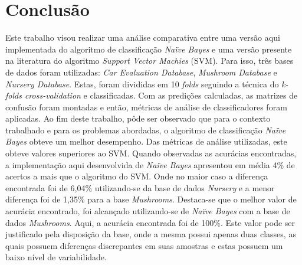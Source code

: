\documentclass[12pt]{article}
\begin{document}
\section{Conclusão} \label{conclu}
    Este trabalho visou realizar uma análise comparativa entre uma versão aqui implementada do algoritmo de classificação \textit{Naïve Bayes} e uma versão presente na literatura do algoritmo \textit{Support Vector Machies} (SVM). Para isso, três bases de dados foram utilizadas: \textit{Car Evaluation Database}, \textit{Mushroom Database} e \textit{Nursery Database}. Estas, foram divididas em 10 \textit{folds} seguindo a técnica do \textit{k-folds cross-validation} e classificadas. Com as predições calculadas, as matrizes de confusão foram montadas e então, métricas de análise de classificadores foram aplicadas. Ao fim deste trabalho, pôde ser observado que para o contexto trabalhado e para os problemas abordadas, o algoritmo de classificação \textit{Naïve Bayes} obteve um melhor desempenho. Das métricas de análise utilizadas, este obteve valores superiores ao SVM. Quando observadas as acurácias encontradas, a implementação aqui desenvolvida de \textit{Naïve Bayes} apresentou em média 4\% de acertos a mais que o algoritmo do SVM. Onde no maior caso a diferença encontrada foi de 6,04\% utilizando-se da base de dados \textit{Nursery} e a menor diferença foi de 1,35\% para a base \textit{Mushrooms}. Destaca-se que o melhor valor de acurácia encontrado, foi alcançado utilizando-se de \textit{Naïve Bayes} com a base de dados \textit{Mushrooms}. Aqui, a acurácia encontrada foi de 100\%. Este valor pode ser justificado pela disposição da base, onde a mesma possui apenas duas classes, as quais possuem diferenças discrepantes em suas amostras e estas possuem um baixo nível de variabilidade.



\end{document}
